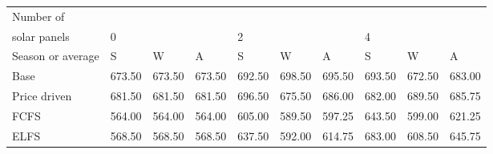 \begin{table}[h] 
\centering 
\begin{tabular}{l|lll|lll|lll}Number of \\ solar panels&0& & &2& & &4& & \\ \hline 
Season or average & S & W & A & S & W & A & S & W & A \\ \hline 
Base&673.50&673.50&673.50&692.50&698.50&695.50&693.50&672.50&683.00 \\ 
Price driven&681.50&681.50&681.50&696.50&675.50&686.00&682.00&689.50&685.75 \\ 
FCFS&564.00&564.00&564.00&605.00&589.50&597.25&643.50&599.00&621.25 \\ 
ELFS&568.50&568.50&568.50&637.50&592.00&614.75&683.00&608.50&645.75 \\ 
\end{tabular} 
\end{table}